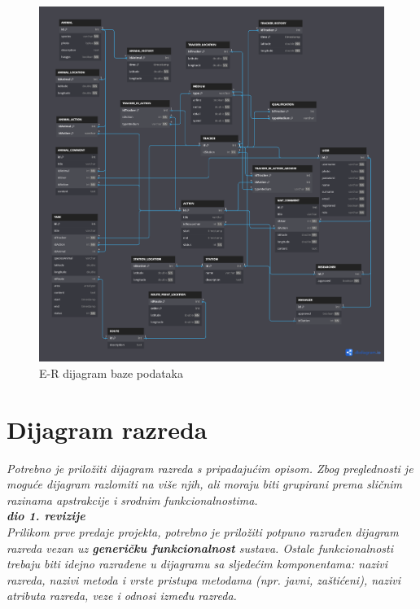 				\begin{figure}[H] %
					\centering
					\includegraphics[width=\textwidth]{slike/baza.PNG}
					\caption{E-R dijagram baze podataka}
					\label{fig:ERdiagram}
				\end{figure}																												
																																	
			\eject
						
			
			
		\section{Dijagram razreda}
		
		\iffalse	\textit{Potrebno je priložiti dijagram razreda s pripadajućim opisom. Zbog preglednosti je moguće dijagram razlomiti na više njih, ali moraju biti grupirani prema sličnim razinama apstrakcije i srodnim funkcionalnostima.}\\
			
			\textbf{\textit{dio 1. revizije}}\\
			
			\textit{Prilikom prve predaje projekta, potrebno je priložiti potpuno razrađen dijagram razreda vezan uz \textbf{generičku funkcionalnost} sustava. Ostale funkcionalnosti trebaju biti idejno razrađene u dijagramu sa sljedećim komponentama: nazivi razreda, nazivi metoda i vrste pristupa metodama (npr. javni, zaštićeni), nazivi atributa razreda, veze i odnosi između razreda.}\\
			
